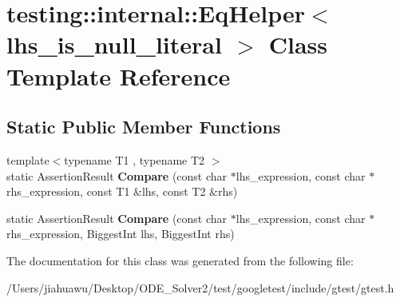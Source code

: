 \hypertarget{classtesting_1_1internal_1_1_eq_helper}{}\section{testing\+:\+:internal\+:\+:Eq\+Helper$<$ lhs\+\_\+is\+\_\+null\+\_\+literal $>$ Class Template Reference}
\label{classtesting_1_1internal_1_1_eq_helper}
\subsection*{Static Public Member Functions}
\begin{DoxyCompactItemize}
\item 
\mbox{\label{classtesting_1_1internal_1_1_eq_helper_ae3572c7374534a916b9117efaa89f33f}} 
{\footnotesize template$<$typename T1 , typename T2 $>$ }\\static Assertion\+Result {\bfseries Compare} (const char $\ast$lhs\+\_\+expression, const char $\ast$rhs\+\_\+expression, const T1 \&lhs, const T2 \&rhs)
\item 
\mbox{\label{classtesting_1_1internal_1_1_eq_helper_aaa42c0059bb3dcc43d556243febb5f1c}} 
static Assertion\+Result {\bfseries Compare} (const char $\ast$lhs\+\_\+expression, const char $\ast$rhs\+\_\+expression, Biggest\+Int lhs, Biggest\+Int rhs)
\end{DoxyCompactItemize}


The documentation for this class was generated from the following file\+:\begin{DoxyCompactItemize}
\item 
/\+Users/jiahuawu/\+Desktop/\+O\+D\+E\+\_\+\+Solver2/test/googletest/include/gtest/gtest.\+h\end{DoxyCompactItemize}
